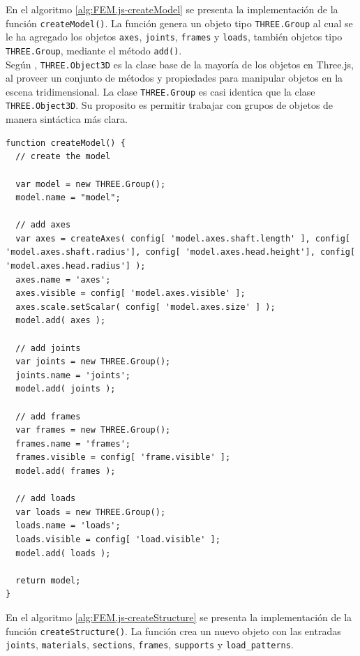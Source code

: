 En el algoritmo \ref{alg:FEM.js-createModel} se presenta la implementación de la función \verb|createModel()|. La función genera un objeto tipo \verb|THREE.Group| al cual se le ha agregado los objetos \verb|axes|, \verb|joints|, \verb|frames| y \verb|loads|, también objetos tipo \verb|THREE.Group|, mediante el método \verb|add()|.\\

Según \cite{threejs-Object3D}, \verb|THREE.Object3D| es la clase base de la mayoría de los objetos en Three.js, al proveer un conjunto de métodos y propiedades para manipular objetos en la escena tridimensional. La clase \verb|THREE.Group| es casi identica que la clase \verb|THREE.Object3D|. Su proposito es permitir trabajar con grupos de objetos de manera sintáctica más clara.\\
\pagebreak

\begin{lstlisting}[language={},caption=Implementación de la función \texttt{createModel()} del archivo \texttt{FEM.js}.,label=alg:FEM.js-createModel,frame=single]
function createModel() {
  // create the model

  var model = new THREE.Group();
  model.name = "model";

  // add axes
  var axes = createAxes( config[ 'model.axes.shaft.length' ], config[ 'model.axes.shaft.radius'], config[ 'model.axes.head.height'], config[ 'model.axes.head.radius'] );
  axes.name = 'axes';
  axes.visible = config[ 'model.axes.visible' ];
  axes.scale.setScalar( config[ 'model.axes.size' ] );
  model.add( axes );
  
  // add joints
  var joints = new THREE.Group();
  joints.name = 'joints';
  model.add( joints );
  
  // add frames
  var frames = new THREE.Group();
  frames.name = 'frames';
  frames.visible = config[ 'frame.visible' ];
  model.add( frames );

  // add loads
  var loads = new THREE.Group();
  loads.name = 'loads';
  loads.visible = config[ 'load.visible' ];
  model.add( loads );

  return model;
}
\end{lstlisting}
\bigskip

En el algoritmo \ref{alg:FEM.js-createStructure} se presenta la implementación de la función \verb|createStructure()|. La función crea un nuevo objeto con las entradas \verb|joints|, \verb|materials|, \verb|sections|, \verb|frames|, \verb|supports| y \verb|load_patterns|.\\

